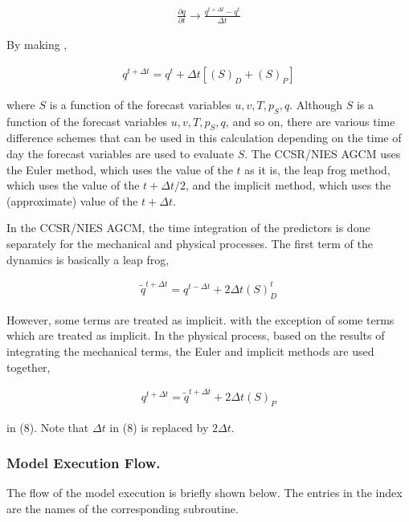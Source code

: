 \begin{eqnarray}
  \frac{\partial{q}}{\partial {t}} \rightarrow \frac{q^{t+\Delta t} - q^{t}}{\Delta t}
\end{eqnarray}

By making ,

\begin{eqnarray}
  q^{t+\Delta t} = q^{t}
       + \Delta t \left[ \left( S \right)_D + \left( S \right)_P  \right]
\end{eqnarray}

where \(S\) is a function of the forecast variables \(u,v,T,p_S,q\).
Although \(S\) is a function of the forecast variables \(u,v,T,p_S,q\),
and so on, there are various time difference schemes that can be used in
this calculation depending on the time of day the forecast variables are
used to evaluate \(S\). The CCSR/NIES AGCM uses the Euler method, which
uses the value of the \(t\) as it is, the leap frog method, which uses
the value of the \(t+\Delta t/2\), and the implicit method, which uses
the (approximate) value of the \(t+\Delta t\).

In the CCSR/NIES AGCM, the time integration of the predictors is done
separately for the mechanical and physical processes. The first term of
the dynamics is basically a leap frog,

\begin{eqnarray}
  \tilde{q}^{t+\Delta t} = q^{t-\Delta t} + 2 \Delta t \left( S \right)_D^{t}
\end{eqnarray}

However, some terms are treated as implicit. with the exception of some
terms which are treated as implicit. In the physical process, based on
the results of integrating the mechanical terms, the Euler and implicit
methods are used together,

\begin{eqnarray}
  q^{t+\Delta t} = \tilde{q}^{t+\Delta t} + 2 \Delta t \left( S \right)_P
\end{eqnarray}

in (8). Note that \(\Delta t\) in (8) is replaced by \(2 \Delta t\).

\hypertarget{model-execution-flow.}{%
\subsubsection{Model Execution Flow.}\label{model-execution-flow.}}

The flow of the model execution is briefly shown below. The entries in
the index are the names of the corresponding subroutine.

